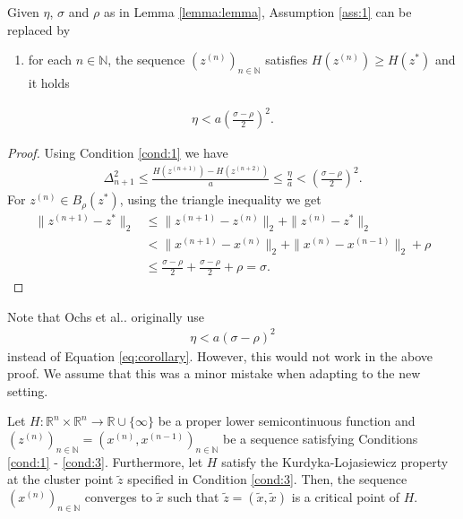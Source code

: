 \documentclass[onecolumn,final,a4paper,13pt,reqno]{siamart}
\makeatletter
\DeclareRobustCommand\onedot{\futurelet\@let@token\@onedot}
\def\@onedot{\ifx\@let@token.\else.\null\fi\xspace}
\def\etal{{et al}\onedot}
\makeatother
\begin{document}
\begin{corollarymd}
	Given $\eta$, $\sigma$ and $\rho$ as in Lemma \ref{lemma:lemma}, Assumption \ref{ass:1} can be replaced by
	\begin{enumerate}[label=(A\arabic*')]
		\item for each $n \in \mathbb{N}$, the sequence $(z^{(n)})_{n \in \mathbb{N}}$ satisfies $H(z^{(n)}) \geq H(z^\ast)$\label{ass:1p} and it holds
	\end{enumerate}
	\begin{align}
		\eta < a\left(\frac{\sigma - \rho}{2}\right)^2\label{eq:corollary}.
	\end{align}\label{corollary:corollary}
\end{corollarymd}

\begin{proof}
	Using Condition \ref{cond:1} we have
	\begin{align}
		\Delta_{n + 1}^2 \leq \frac{H(z^{(n + 1)}) - H(z^{(n + 2)})}{a} \leq \frac{\eta}{a} < \left(\frac{\sigma - \rho}{2}\right)^2.
	\end{align}
	For $z^{(n)} \in B_\rho(z^\ast)$, using the triangle inequality we get
	\begin{align}
		\|z^{(n + 1)} - z^\ast\|_2 &\leq \|z^{(n + 1)} - z^{(n)}\|_2 + \|z^{(n)} - z^\ast\|_2\\
		&< \|x^{(n + 1)} - x^{(n)}\|_2 + \|x^{(n)} - x^{(n - 1)}\|_2 + \rho\\
		&\leq \frac{\sigma - \rho}{2} + \frac{\sigma - \rho}{2} + \rho = \sigma.
	\end{align}\label{theorem:theorem}
\end{proof}

Note that Ochs \etal originally use
\begin{align}
	\eta < a(\sigma - \rho)^2
\end{align}
instead of Equation \eqref{eq:corollary}. However, this would not work in the above proof. We assume that this was a minor mistake when adapting \cite[Cor. 2.8]{AttouchBolteSvaiter:2013} to the new setting.

\begin{theoremmd}
	Let $H: \mathbb{R}^n \times \mathbb{R}^n \rightarrow \mathbb{R} \cup \{\infty\}$ be a proper lower semicontinuous function and $(z^{(n)})_{n \in \mathbb{N}} = (x^{(n)}, x^{(n - 1)})_{n \in \mathbb{N}}$ be a sequence satisfying Conditions \ref{cond:1} - \ref{cond:3}. Furthermore, let $H$ satisfy the Kurdyka-Lojasiewicz property at the cluster point $\tilde{z}$ specified in Condition \ref{cond:3}. Then, the sequence $(x^{(n)})_{n \in \mathbb{N}}$  converges to $\tilde{x}$ such that $\tilde{z} = (\tilde{x}, \tilde{x})$ is a critical point of $H$.
\end{theoremmd}
\end{document}
